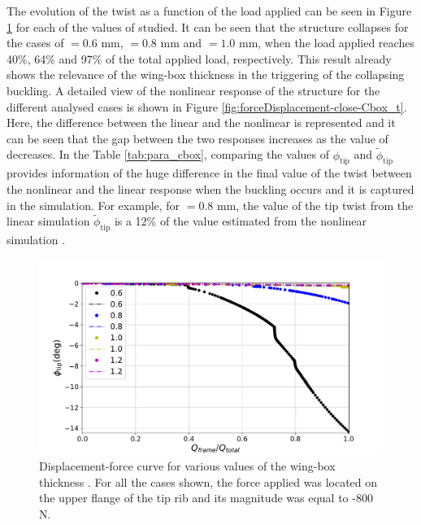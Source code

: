     The evolution of the twist as a function of the load applied can be seen in Figure \ref{fig:forceDisplacement-far-Cbox_t} for each of the values of \boxt studied. It can be seen that the structure collapses for the cases of \boxt$= 0.6$ mm, \boxt$= 0.8$ mm and \boxt$= 1.0$ mm, when the load applied reaches 40\%, 64\% and 97\% of the total applied load, respectively. This result already shows the relevance of the wing-box thickness \boxt in the triggering of the collapsing buckling. A detailed view of the nonlinear response of the structure for the different analysed cases is shown in Figure \ref{fig:forceDisplacement-close-Cbox_t}. Here, the difference between the linear and the nonlinear is represented and it can be seen that the gap between the two responses increases as the value of \boxt decreases. In the Table \ref{tab:para_cbox}, comparing the values of $\phi_{\mathrm{tip}}$ and $\tilde{\phi}_{\mathrm{tip}}$ provides information of the huge difference in the final value of the twist between the nonlinear and the linear response when the buckling occurs and it is captured in the simulation. For example, for \boxt$= 0.8$ mm, the value of the tip twist from the linear simulation $\tilde{\phi}_{\mathrm{tip}}$ is a 12\% of the value estimated from the nonlinear simulation \phinonlin.

    \begin{figure}[!htpb] %
      \centering
      \includegraphics[width=0.8 \textwidth]{figures/../figures/result-sim/cbox/force_displacement-far}
      \caption[Displacement-force curve for various values of the wing-box thickness]{Displacement-force curve for various values of the wing-box thickness \boxt. For all the cases shown, the force applied was located on the upper flange of the tip rib and its magnitude was equal to -800 N.}\label{fig:forceDisplacement-far-Cbox_t}
    \end{figure}

